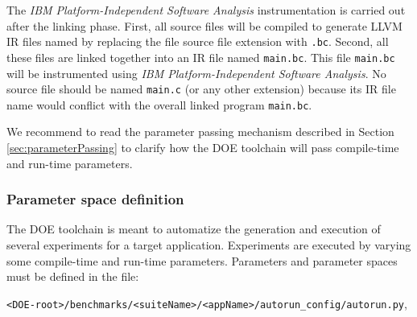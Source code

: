 \documentclass[a4paper, 10pt]{article}
\begin{document}
The \textit{IBM Platform-Independent Software Analysis} instrumentation is carried out after the linking phase.
First, all source files will be compiled to generate LLVM IR files named by replacing the file source file extension with \verb!.bc!.
Second, all these files are linked together into an IR file named \verb!main.bc!. This file \verb!main.bc! will be instrumented using \textit{IBM Platform-Independent Software Analysis}.
No source file should be named \verb!main.c! (or any other extension) because its IR file name would conflict with the
overall linked program \verb!main.bc!.

We recommend to read the parameter passing mechanism described in Section \ref{sec:parameterPassing} to clarify how the DOE toolchain will
pass compile-time and run-time parameters.


\subsubsection{Parameter space definition}
\label{sec:parDefinition}
The DOE toolchain is meant to automatize the generation and execution of several experiments for a target application.
Experiments are executed by varying some compile-time and run-time parameters. Parameters and parameter spaces must be defined in the file:

\verb!<DOE-root>/benchmarks/<suiteName>/<appName>/autorun_config/autorun.py!,
\end{document}

